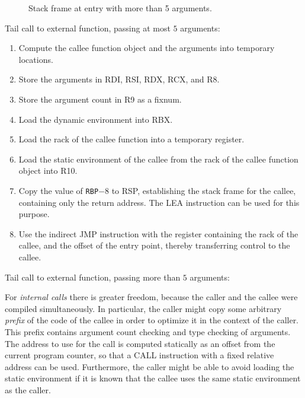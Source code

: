 \begin{figure}
\begin{center}
\end{center}
\caption{\label{fig-x86-64-stack-frame-at-entry}
Stack frame at entry with more than 5 arguments.}
\end{figure}

Tail call to external function, passing at most $5$ arguments:

\begin{enumerate}
\item Compute the callee function object and the arguments into
  temporary locations.
\item Store the arguments in RDI, RSI, RDX, RCX, and R8.
\item Store the argument count in R9 as a fixnum.
\item Load the dynamic environment into RBX.
\item Load the rack of the callee function into a temporary register.
\item Load the static environment of the callee from the rack of the
  callee function object into R10.
\item Copy the value of \texttt{RBP}$ - 8$ to RSP, establishing the stack frame
  for the callee, containing only the return address.  The LEA
  instruction can be used for this purpose.
\item Use the indirect JMP instruction with the register containing
  the rack of the callee, and the offset of the entry point, thereby
  transferring control to the callee.
\end{enumerate}

Tail call to external function, passing more than $5$ arguments:%

For \emph{internal calls} there is greater freedom, because the caller
and the callee were compiled simultaneously.  In particular, the
caller might copy some arbitrary \emph{prefix} of the code of the
callee in order to optimize it in the context of the caller.  This
prefix contains argument count checking and type checking of
arguments.  The address to use for the call is computed statically as
an offset from the current program counter, so that a CALL instruction
with a fixed relative address can be used.  Furthermore, the caller
might be able to avoid loading the static environment if it is known
that the callee uses the same static environment as the caller.

